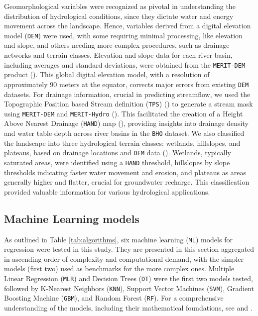 \documentclass[12pt]{article}
\begin{document}
\par Geomorphological variables were recognized as pivotal in understanding the distribution of hydrological conditions, since they dictate water and energy movement across the landscape. Hence, variables derived from a digital elevation model (\texttt{DEM}) were used, with some requiring minimal processing, like elevation and slope, and others needing more complex procedures, such as drainage networks and terrain classes. Elevation and slope data for each river basin, including averages and standard deviations, were obtained from the \texttt{MERIT-DEM} product (\cite{yamazaki2017}). This global digital elevation model, with a resolution of approximately 90 meters at the equator, corrects major errors from existing \texttt{DEM} datasets. For drainage information, crucial in predicting streamflow, we used the Topographic Position based Stream definition (\texttt{TPS}) (\cite{barbedo2022b}) to generate a stream mask using \texttt{MERIT-DEM} and \texttt{MERIT-Hydro} (\cite{yamazaki2019}). This facilitated the creation of a Height Above Nearest Drainage (\texttt{HAND}) map (\cite{nobre2011, renno2008}), providing insights into drainage density and water table depth across river basins in the \texttt{BHO} dataset. We also classified the landscape into three hydrological terrain classes: wetlands, hillslopes, and plateaus, based on drainage locations and \texttt{DEM} data (\cite{gao2014, gharari2011, savenije2010}). Wetlands, typically saturated areas, were identified using a \texttt{HAND} threshold, hillslopes by slope thresholds indicating faster water movement and erosion, and plateaus as areas generally higher and flatter, crucial for groundwater recharge. This classification provided valuable information for various hydrological applications.

\subsection{Machine Learning models} \label{sec:methods:ml}

\par As outlined in Table \ref{tab:algorithms}, six machine learning (\texttt{ML}) models for regression were tested in this study. They are presented in this section aggregated in ascending order of complexity and computational demand, with the simpler models (first two) used as benchmarks for the more complex ones. Multiple Linear Regression (\texttt{MLR}) and Decision Trees (\texttt{DT}) were the first two models tested, followed by K-Nearest Neighbors (\texttt{KNN}), Support Vector Machines (\texttt{SVM}), Gradient Boosting Machine (\texttt{GBM}), and Random Forest (\texttt{RF}). For a comprehensive understanding of the models, including their mathematical foundations, see \cite{kuhn2013} and \cite{shalev2014}. 
\end{document}
